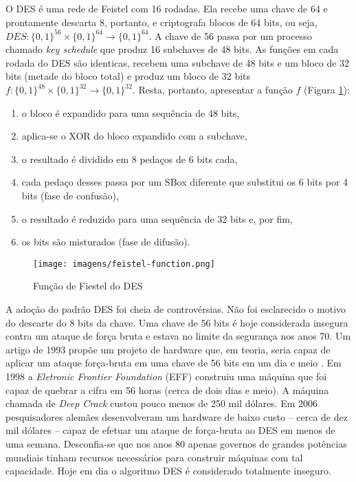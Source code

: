 O DES é uma rede de Feistel com 16 rodadas.
Ela recebe uma chave de 64 e prontamente descarta 8, portanto, e criptografa blocos de 64 bits, ou seja, $DES: \{0,1\}^{56} \times \{0,1\}^{64} \to \{0,1\}^{64}$.
A chave de 56 passa por um processo chamado {\em key schedule} que produz 16 subchaves de 48 bits.
As funções em cada rodada do DES são identicas, recebem uma subchave de 48 bits e um bloco de 32 bits (metade do bloco total) e produz um bloco de 32 bits $f: \{0,1\}^{48} \times \{0,1\}^{32} \to \{0,1\}^{32}$.
Resta, portanto, apresentar a função $f$ (Figura \ref{fig:feistel-function}):
\begin{enumerate}
\item o bloco é expandido para uma sequência de 48 bits,
\item aplica-se o XOR do bloco expandido com a subchave,
\item o resultado é dividido em 8 pedaços de 6 bits cada,
\item cada pedaço desses passa por um SBox diferente que substitui os 6 bits por 4 bits (fase de confusão),
\item o resultado é reduzido para uma sequência de 32 bits e, por fim,
\item os bits são misturados (fase de difusão).
\end{enumerate}

\begin{figure}[!htp]
  \centering
  \texttt{[image: imagens/feistel-function.png]}
  \caption{Função de Fiestel do DES}
  \label{fig:feistel-function}
\end{figure}


A adoção do padrão DES foi cheia de controvérsias.
Não foi esclarecido o motivo do descarte do 8 bits da chave.
Uma chave de 56 bits é hoje considerada insegura contra um ataque de força bruta e estava no limite da segurança nos anos 70.
Um artigo de 1993 propõe um projeto de hardware que, em teoria, seria capaz de aplicar um ataque força-bruta em uma chave de 56 bits em um dia e meio \cite{}.
Em 1998 a {\em Eletronic Frontier Foundation} (EFF) construiu uma máquina que foi capaz de quebrar a cifra em 56 horas (cerca de dois dias e meio).
A máquina chamada de {\em Deep Crack} custou pouco menos de 250 mil dólares.
Em 2006 pesquisadores alemães desenvolveram um hardware de baixo custo -- cerca de dez mil dólares -- capaz de efetuar um ataque de força-bruta ao DES em menos de uma semana.
Desconfia-se que nos anos 80 apenas governos de grandes potências mundiais tinham recursos necessários para construir máquinas com tal capacidade.
Hoje em dia o algoritmo DES é considerado totalmente inseguro.

